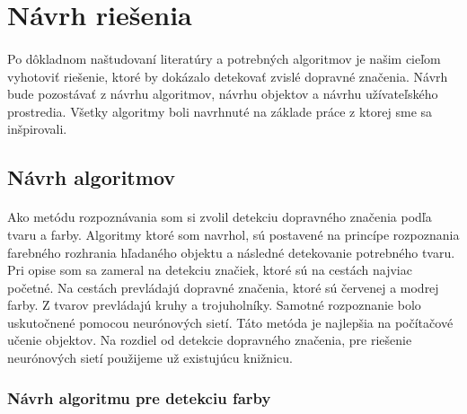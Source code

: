 \documentclass[12pt]{article}
\begin{document}
\section{Návrh riešenia}
\paragraph{}
Po dôkladnom naštudovaní literatúry a potrebných algoritmov je našim cieľom vyhotoviť riešenie, ktoré by dokázalo detekovať zvislé dopravné značenia.
Návrh bude pozostávať z návrhu algoritmov, návrhu objektov a návrhu užívateľského prostredia. Všetky algoritmy boli navrhnuté na základe práce \cite{tfs_pdf} z ktorej sme sa inšpirovali.
\subsection{Návrh algoritmov}
\paragraph{}
Ako metódu rozpoznávania som si zvolil detekciu dopravného značenia podľa tvaru a farby. 
Algoritmy ktoré som navrhol, sú postavené na princípe rozpoznania farebného rozhrania hľadaného objektu a následné detekovanie potrebného tvaru.
Pri opise som sa zameral na detekciu značiek, ktoré sú na cestách najviac početné.
Na cestách prevládajú dopravné značenia, ktoré sú červenej a modrej farby. Z tvarov prevládajú kruhy a trojuholníky.
Samotné rozpoznanie bolo uskutočnené pomocou neurónových sietí. Táto metóda je najlepšia na počítačové učenie objektov.
Na rozdiel od detekcie dopravného značenia, pre riešenie neurónových sietí použijeme už existujúcu knižnicu.
\subsubsection{Návrh algoritmu pre detekciu farby}
\end{document}
